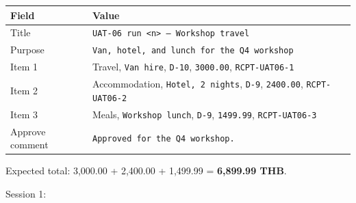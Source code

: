 {\def\LTcaptype{none} %
\begin{longtable}[]{@{}
  >{\raggedright\arraybackslash}p{}
  >{\raggedright\arraybackslash}p{}@{}}
\toprule\noalign{}
\begin{minipage}[b]{\linewidth}\raggedright
Field
\end{minipage} & \begin{minipage}[b]{\linewidth}\raggedright
Value
\end{minipage} \\
\midrule\noalign{}
\endhead
\bottomrule\noalign{}
\endlastfoot
Title & \texttt{UAT-06\ run\ \textless{}n\textgreater{}\ –\ Workshop\ travel} \\
Purpose & \texttt{Van, hotel, and lunch for the Q4 workshop} \\
Item 1 & Travel, \texttt{Van hire}, \texttt{D-10}, \texttt{3000.00}, \texttt{RCPT-UAT06-1} \\
Item 2 & Accommodation, \texttt{Hotel, 2 nights}, \texttt{D-9}, \texttt{2400.00}, \texttt{RCPT-UAT06-2} \\
Item 3 & Meals, \texttt{Workshop lunch}, \texttt{D-9}, \texttt{1499.99}, \texttt{RCPT-UAT06-3} \\
Approve comment & \texttt{Approved for the Q4 workshop.} \\
\end{longtable}
}

Expected total: 3,000.00 + 2,400.00 + 1,499.99 = \textbf{6,899.99 THB}.

Session 1:


